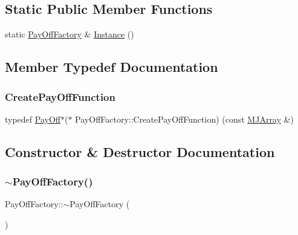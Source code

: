 \subsection*{Static Public Member Functions}
\begin{DoxyCompactItemize}
\item 
static \hyperlink{classPayOffFactory}{Pay\+Off\+Factory} \& \hyperlink{classPayOffFactory_ab591be8c5a73e452159a0944810d912e}{Instance} ()
\end{DoxyCompactItemize}


\subsection{Member Typedef Documentation}
\hypertarget{classPayOffFactory_ad2e3f0111b56ef662d95592074625e52}{}\label{classPayOffFactory_ad2e3f0111b56ef662d95592074625e52} 
\subsubsection{\texorpdfstring{Create\+Pay\+Off\+Function}{CreatePayOffFunction}}
{\footnotesize\ttfamily typedef \hyperlink{classPayOff}{Pay\+Off}$\ast$($\ast$ Pay\+Off\+Factory\+::\+Create\+Pay\+Off\+Function) (const \hyperlink{classMJArray}{M\+J\+Array} \&)}



\subsection{Constructor \& Destructor Documentation}
\hypertarget{classPayOffFactory_a8324350697d8ce559faa232f6b09c47c}{}\label{classPayOffFactory_a8324350697d8ce559faa232f6b09c47c} 
\subsubsection{\texorpdfstring{$\sim$\+Pay\+Off\+Factory()}{~PayOffFactory()}}
{\footnotesize\ttfamily Pay\+Off\+Factory\+::$\sim$\+Pay\+Off\+Factory (\begin{DoxyParamCaption}{ }\end{DoxyParamCaption})\hspace{0.3cm}{\ttfamily [inline]}}



